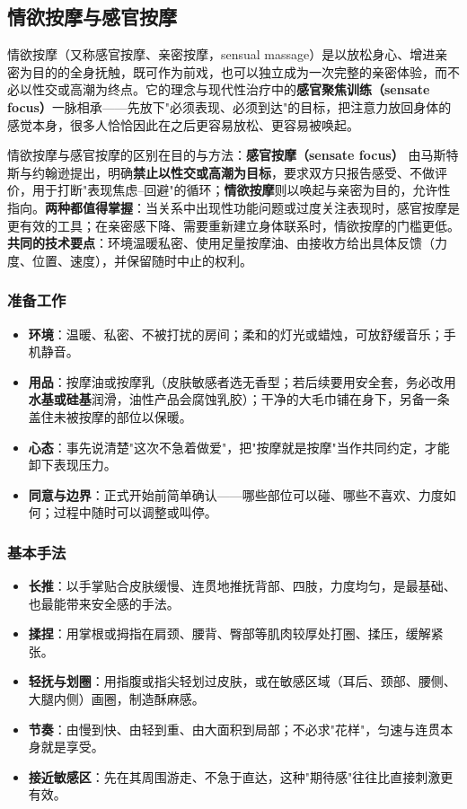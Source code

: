 \documentclass[12pt,UTF8]{ctexbook}
\begin{document}
\subsection{情欲按摩与感官按摩}

情欲按摩（又称感官按摩、亲密按摩，sensual massage）是以放松身心、增进亲密为目的的全身抚触，既可作为前戏，也可以独立成为一次完整的亲密体验，而不必以性交或高潮为终点。它的理念与现代性治疗中的\textbf{感官聚焦训练（sensate focus）}一脉相承——先放下"必须表现、必须到达"的目标，把注意力放回身体的感觉本身，很多人恰恰因此在之后更容易放松、更容易被唤起。


情欲按摩与感官按摩的区别在目的与方法：\textbf{感官按摩（sensate focus）} 由马斯特斯与约翰逊提出，明确\textbf{禁止以性交或高潮为目标}，要求双方只报告感受、不做评价，用于打断"表现焦虑--回避"的循环；\textbf{情欲按摩}则以唤起与亲密为目的，允许性指向。\textbf{两种都值得掌握}：当关系中出现性功能问题或过度关注表现时，感官按摩是更有效的工具；在亲密感下降、需要重新建立身体联系时，情欲按摩的门槛更低。\textbf{共同的技术要点}：环境温暖私密、使用足量按摩油、由接收方给出具体反馈（力度、位置、速度），并保留随时中止的权利。

\subsubsection{准备工作}
\begin{itemize}
	\item \textbf{环境}：温暖、私密、不被打扰的房间；柔和的灯光或蜡烛，可放舒缓音乐；手机静音。
	\item \textbf{用品}：按摩油或按摩乳（皮肤敏感者选无香型；若后续要用安全套，务必改用\textbf{水基或硅基}润滑，油性产品会腐蚀乳胶）；干净的大毛巾铺在身下，另备一条盖住未被按摩的部位以保暖。
	\item \textbf{心态}：事先说清楚"这次不急着做爱"，把"按摩就是按摩"当作共同约定，才能卸下表现压力。
	\item \textbf{同意与边界}：正式开始前简单确认——哪些部位可以碰、哪些不喜欢、力度如何；过程中随时可以调整或叫停。
\end{itemize}

\subsubsection{基本手法}
\begin{itemize}
	\item \textbf{长推}：以手掌贴合皮肤缓慢、连贯地推抚背部、四肢，力度均匀，是最基础、也最能带来安全感的手法。
	\item \textbf{揉捏}：用掌根或拇指在肩颈、腰背、臀部等肌肉较厚处打圈、揉压，缓解紧张。
	\item \textbf{轻抚与划圈}：用指腹或指尖轻划过皮肤，或在敏感区域（耳后、颈部、腰侧、大腿内侧）画圈，制造酥麻感。
	\item \textbf{节奏}：由慢到快、由轻到重、由大面积到局部；不必求"花样"，匀速与连贯本身就是享受。
	\item \textbf{接近敏感区}：先在其周围游走、不急于直达，这种"期待感"往往比直接刺激更有效。
\end{itemize}
\end{document}
